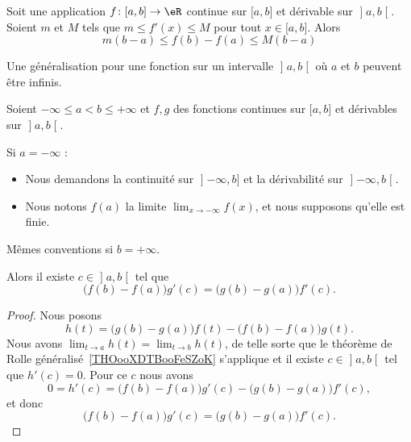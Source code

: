 \begin{theorem}	\label{THOooRALIooVGDcFi}
	Soit une application \(f \colon \mathopen[ a,b\mathclose]\to \eR  \) continue sur \( \mathopen[ a,b\mathclose]\) et dérivable sur \( \mathopen] a,b\mathclose[\). Soient \( m\) et \( M\) tels que \( m\leq f'(x)\leq M\) pour tout \( x\in\mathopen[ a,b\mathclose]\). Alors
	\begin{equation}
		m(b-a)\leq f(b)-f(a)\leq M(b-a)
	\end{equation}
\end{theorem}


Une généralisation pour une fonction sur un intervalle \( \mathopen] a , b \mathclose[\) où \( a\) et \( b\) peuvent être infinis.
\begin{theorem} \label{THOooRIIBooOjkzMa}
	Soient \( -\infty\leq a<b\leq +\infty\) et \( f,g\) des fonctions continues sur \( \mathopen[ a , b \mathclose]\) et dérivables sur \( \mathopen] a , b \mathclose[\).

		Si \( a=-\infty\) :
		\begin{itemize}
			\item Nous demandons la continuité sur \( \mathopen] -\infty , b \mathclose]\) et la dérivabilité sur \( \mathopen] -\infty , b \mathclose[\).
			\item
			      Nous notons \( f(a)\) la limite \( \lim_{x\to -\infty} f(x)\), et nous supposons qu'elle est finie.
		\end{itemize}

		Mêmes conventions si \( b=+\infty\).

		Alors il existe \( c\in \mathopen] a , b \mathclose[\) tel que
	\begin{equation}
		\big( f(b)-f(a) \big)g'(c)=\big( g(b)-g(a) \big)f'(c).
	\end{equation}
\end{theorem}


\begin{proof}
	Nous posons
	\begin{equation}
		h(t)=\big( g(b)-g(a) \big)f(t)-\big( f(b)-f(a) \big)g(t).
	\end{equation}
	Nous avons \( \lim_{t\to a} h(t)=\lim_{t\to b} h(t)\), de telle sorte que le théorème de Rolle généralisé~\ref{THOooXDTBooFeSZoK} s'applique et il existe \( c\in \mathopen] a , b \mathclose[\) tel que \( h'(c)=0\). Pour ce \( c\) nous avons
	\begin{equation}
		0=h'(c)=\big( f(b)-f(a) \big)g'(c)-\big( g(b)-g(a) \big)f'(c),
	\end{equation}
	et donc
	\begin{equation}
		\big( f(b)-f(a) \big)g'(c)=\big( g(b)-g(a) \big)f'(c).
	\end{equation}
\end{proof}

